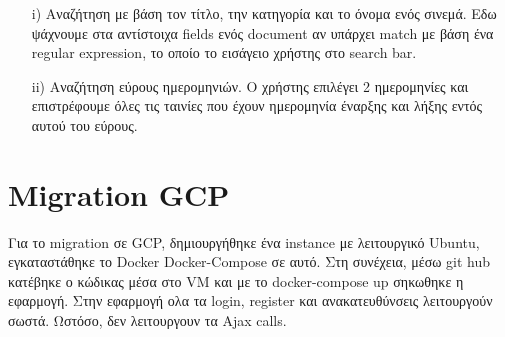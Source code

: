 \documentclass{article}
\begin{document}
    \begin{itemize}
        \item[i)] Αναζήτηση με βάση τον τίτλο, την κατηγορία και το όνομα ενός σινεμά. Εδω ψάχνουμε στα αντίστοιχα fields ενός document αν υπάρχει match με βάση ένα regular expression, το οποίο το εισάγειο χρήστης στο search bar.
        \item[ii)] Aναζήτηση εύρους ημερομηνιών. Ο χρήστης επιλέγει 2 ημερομηνίες και επιστρέφουμε όλες τις ταινίες που έχουν ημερομηνία έναρξης και λήξης εντός αυτού του εύρους.
    \end{itemize}
    
\section*{Migration GCP}	
    Για το migration σε GCP, δημιουργήθηκε ένα instance με λειτουργικό Ubuntu, εγκαταστάθηκε το Docker Docker-Compose σε αυτό. Στη συνέχεια, μέσω git hub κατέβηκε ο κώδικας μέσα στο VM και με το docker-compose up σηκωθηκε η εφαρμογή. Στην εφαρμογή ολα τα login, register και ανακατευθύνσεις λειτουργούν σωστά. Ωστόσο, δεν λειτουργουν τα Ajax calls.
\end{document}
